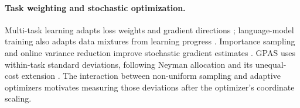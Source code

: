 \paragraph{Task weighting and stochastic optimization.}
Multi-task learning adapts loss weights and gradient directions
\citep{chen2018gradnorm,sener2019multitasklearningmultiobjectiveoptimization,
yu2020gradientsurgerymultitasklearning}; language-model training also adapts
data mixtures from learning progress \citep{albalak2023efficient,wang2025dump}.
Importance sampling and online variance reduction improve stochastic
gradient estimates \citep{katharopoulos2018samplescreatedequaldeep,
borsos2018online}. GPAS uses within-task standard deviations, following
Neyman allocation and its unequal-cost extension
\citep{neyman1934representative,cochran1977sampling}.
The interaction between non-uniform sampling and adaptive optimizers
\citep{lahire2023nonuniformadaptive} motivates measuring those deviations
after the optimizer's coordinate scaling.
